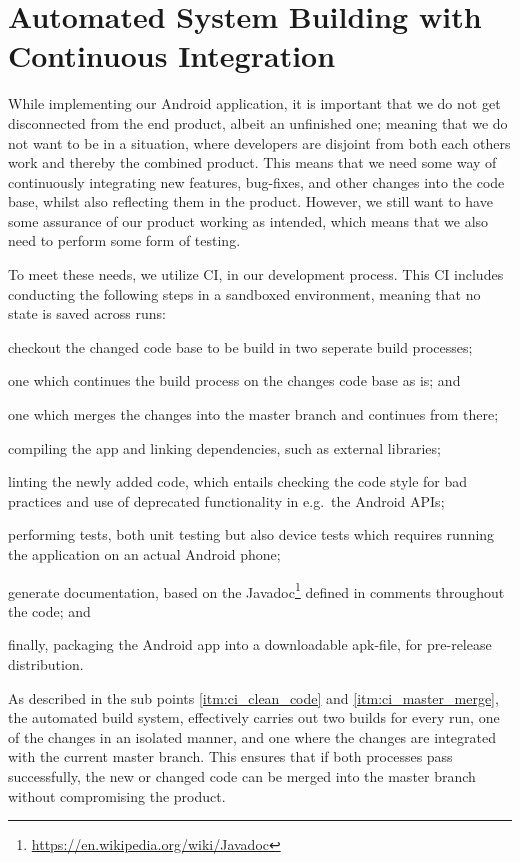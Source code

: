 \section{Automated System Building with Continuous Integration}
While implementing our Android application, it is important that we do not get disconnected from the end product, albeit an unfinished one; meaning that we do not want to be in a situation, where developers are disjoint from both each others work and thereby the combined product.
This means that we need some way of continuously integrating new features, bug-fixes, and other changes into the code base, whilst also reflecting them in the product.
However, we still want to have some assurance of our product working as intended, which means that we also need to perform some form of testing.

\bigskip
To meet these needs, we utilize \ac{CI}, in our development process.
This \ac{CI} includes conducting the following steps in a sandboxed environment, meaning that no state is saved across runs:
\begin{enumberate}
\item checkout the changed code base to be build in two seperate build processes;
\begin{enumberate}
    \item one which continues the build process on the changes code base as is; and\label{itm:ci_clean_code}
    \item one which merges the changes into the master branch and continues from there;\label{itm:ci_master_merge}
\end{enumberate}
\item compiling the app and linking dependencies, such as external libraries;
\item linting the newly added code, which entails checking the code style for bad practices and use of deprecated functionality in e.g.~the Android APIs;
\item performing tests, both unit testing but also device tests which requires running the application on an actual Android phone;
\item generate documentation, based on the Javadoc\footnote{\url{https://en.wikipedia.org/wiki/Javadoc}} defined in comments throughout the code; and
\item finally, packaging the Android app into a downloadable apk-file, for pre-release distribution.
\end{enumberate}
As described in the sub points \ref{itm:ci_clean_code} and \ref{itm:ci_master_merge}, the automated build system, effectively carries out two builds for every run, one of the changes in an isolated manner, and one where the changes are integrated with the current master branch.
This ensures that if both processes pass successfully, the new or changed code can be merged into the master branch without compromising the product.

